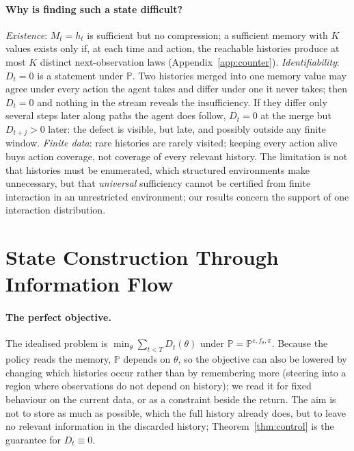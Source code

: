 \documentclass[11pt]{article}
\theoremstyle{plain}
\theoremstyle{definition}
\theoremstyle{remark}
\newcommand{\PP}{\mathbb{P}}
\begin{document}
\paragraph{Why is finding such a state difficult?}
\emph{Existence}: $M_t = h_t$ is sufficient but no compression; a sufficient memory with $K$ values exists only if, at each time and action, the reachable histories produce at most $K$ distinct next-observation laws (Appendix~\ref{app:counter}). \emph{Identifiability}: $D_t = 0$ is a statement under $\PP$. Two histories merged into one memory value may agree under every action the agent takes and differ under one it never takes; then $D_t = 0$ and nothing in the stream reveals the insufficiency. If they differ only several steps later along paths the agent does follow, $D_t = 0$ at the merge but $D_{t+j} > 0$ later: the defect is visible, but late, and possibly outside any finite window. \emph{Finite data}: rare histories are rarely visited; keeping every action alive buys action coverage, not coverage of every relevant history. The limitation is not that histories must be enumerated, which structured environments make unnecessary, but that \emph{universal} sufficiency cannot be certified from finite interaction in an unrestricted environment; our results concern the support of one interaction distribution.

\section{State Construction Through Information Flow}

\paragraph{The perfect objective.}
The idealised problem is $\min_\theta \sum_{t < T} D_t(\theta)$ under $\PP = \PP^{e, f_\theta, \pi}$. Because the policy reads the memory, $\PP$ depends on $\theta$, so the objective can also be lowered by changing which histories occur rather than by remembering more (steering into a region where observations do not depend on history); we read it for fixed behaviour on the current data, or as a constraint beside the return. The aim is not to store as much as possible, which the full history already does, but to leave no relevant information in the discarded history; Theorem~\ref{thm:control} is the guarantee for $D_t \equiv 0$.
\end{document}
